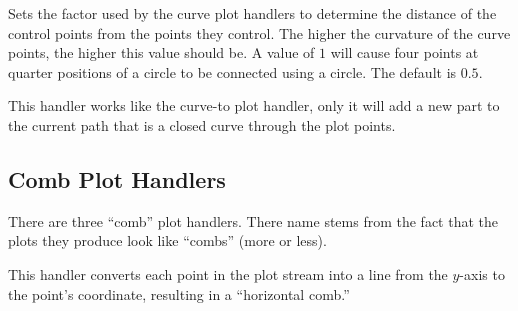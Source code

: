 \begin{command}{\pgfsetplottension{}}
  Sets the factor used by the curve plot handlers to determine the
  distance of the control points from the points they control. The
  higher the curvature of the curve points, the higher this value
  should be. A value of $1$ will cause four points at quarter
  positions of a circle to be connected using a circle. The default is
  $0.5$. 

\begin{codeexample}[]
\end{codeexample}
\end{command}


\begin{command}{\pgfplothandlerclosedcurve}
  This handler works like the curve-to plot handler, only it will
  add a new part to the current path that is a closed curve through
  the plot points.
\begin{codeexample}[]
\end{codeexample}
\end{command}


\subsection{Comb Plot Handlers}

There are three ``comb'' plot handlers. There name stems from the fact
that the plots they produce look like ``combs'' (more or less).

\begin{command}{\pgfplothandlerxcomb}
  This handler converts each point in the plot stream into a line from
  the $y$-axis to the point's coordinate, resulting in a ``horizontal
  comb.''

  
\begin{codeexample}[]
\end{codeexample}
\end{command}


